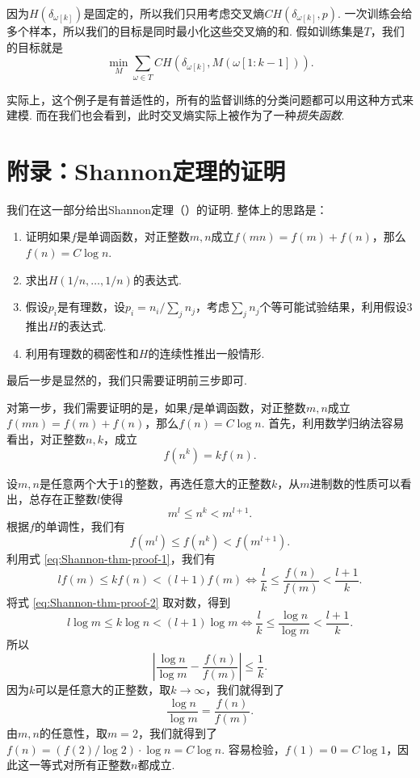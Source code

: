 因为$H(\delta_{\omega[k]})$是固定的，所以我们只用考虑交叉熵$CH(\delta_{\omega[k]},p)$. 一次训练会给多个样本，所以我们的目标是同时最小化这些交叉熵的和. 假如训练集是$T$，我们的目标就是
\[
    \min_{M} \sum_{\omega\in T} CH(\delta_{\omega[k]},M(\omega[1:k-1])).
\]

实际上，这个例子是有普适性的，所有的监督训练的分类问题都可以用这种方式来建模. 而在我们也会看到，此时交叉熵实际上被作为了一种\textit{损失函数}.

\section{附录：Shannon定理的证明}\label{sec:Shannon-thm-proofs}
我们在这一部分给出Shannon定理（）的证明. 整体上的思路是：
\begin{enumerate}
    \item 证明如果$f$是单调函数，对正整数$m,n$成立$f(mn)=f(m)+f(n)$，那么$f(n)=C\log n$.
    \item 求出$H(1/n,\dots,1/n)$的表达式.
    \item 假设$p_i$是有理数，设$p_i=n_i/\sum_j n_j$，考虑$\sum_j n_j$个等可能试验结果，利用假设3推出$H$的表达式.
    \item 利用有理数的稠密性和$H$的连续性推出一般情形.
\end{enumerate}
最后一步是显然的，我们只需要证明前三步即可.

对第一步，我们需要证明的是，如果$f$是单调函数，对正整数$m,n$成立$f(mn)=f(m)+f(n)$，那么$f(n)=C\log n$. 首先，利用数学归纳法容易看出，对正整数$n,k$，成立
\begin{equation}
    f(n^k)=kf(n).\label{eq:Shannon-thm-proof-1}
\end{equation}

设$m,n$是任意两个大于$1$的整数，再选任意大的正整数$k$，从$m$进制数的性质可以看出，总存在正整数$l$使得
\begin{equation}
    m^l\leq n^k < m^{l+1}.\label{eq:Shannon-thm-proof-2}
\end{equation}
根据$f$的单调性，我们有
\[
    f(m^l)\leq f(n^k) < f(m^{l+1}).
\]
利用式 \eqref{eq:Shannon-thm-proof-1}，我们有
\[
    lf(m)\leq kf(n) < (l+1)f(m)\iff \frac{l}{k}\leq \frac{f(n)}{f(m)} < \frac{l+1}{k}.
\]
将式 \eqref{eq:Shannon-thm-proof-2} 取对数，得到
\[
    l\log m\leq k\log n < (l+1)\log m\iff \frac{l}{k}\leq \frac{\log n}{\log m} < \frac{l+1}{k}.
\]
所以
\[
    \left|\frac{\log n}{\log m}-\frac{f(n)}{f(m)}\right|\leq\frac1k.
\]
因为$k$可以是任意大的正整数，取$k\to\infty$，我们就得到了
\[
    \frac{\log n}{\log m}=\frac{f(n)}{f(m)}.
\]
由$m,n$的任意性，取$m=2$，我们就得到了$f(n)=(f(2)/\log 2)\cdot \log n= C\log n$. 容易检验，$f(1)=0=C\log 1$，因此这一等式对所有正整数$n$都成立.


